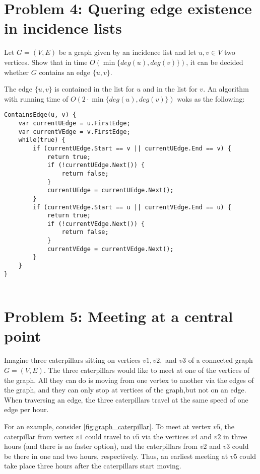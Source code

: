 \documentclass[12pt, a4]{article}
\begin{document}
\section{Problem 4: Quering edge existence in incidence lists}
Let $G= (V, E)$ be a graph given by an incidence list and let $u, v\in V$ two vertices. Show that in time $O(\min\{deg(u),deg(v)\})$, it can be decided whether $G$ contains an edge $\{u, v\}$.

The edge $\{u,v\}$ is contained in the list for $u$ and in the list for $v$. An algorithm with running time of $O(2\cdot\min\{deg(u),deg(v)\})$ woks as the following:
\pagebreak
\begin{lstlisting}
ContainsEdge(u, v) {
	var currentUEdge = u.FirstEdge;
	var currentVEdge = v.FirstEdge;
	while(true) {
		if (currentUEdge.Start == v || currentUEdge.End == v) {
			return true;
			if (!currentUEdge.Next()) {
				return false;
			}
			currentUEdge = currentUEdge.Next();
		}
		if (currentVEdge.Start == u || currentVEdge.End == u) {
			return true;
			if (!currentVEdge.Next()) {
				return false;
			}
			currentVEdge = currentVEdge.Next();
		}
	}
}
	
\end{lstlisting}

\pagebreak
\section{Problem 5: Meeting at a central point}
Imagine three caterpillars sitting on vertices $v1,v2,$ and $v3$ of a connected graph $G= (V, E)$. The three caterpillars would like to meet at one of the vertices of the graph. All they can do is moving from one vertex to another via the edges of the graph, and they can only stop at vertices of the graph,but not on an edge. When traversing an edge, the three caterpillars travel at the same speed of one edge per hour.

 For an example, consider \autoref{fig:graph_caterpillar}. To meet at vertex $v5$, the caterpillar from vertex $v1$ could travel to $v5$ via the vertices $v4$ and $v2$ in three hours (and there is no faster option), and the caterpillars from $v2$ and $v3$ could be there in one and two hours, respectively. Thus, an earliest meeting at $v5$ could take place three hours after the caterpillars start moving.
 
\end{document}
